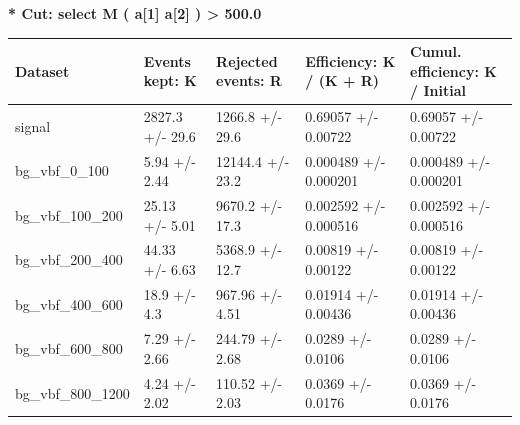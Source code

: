 \documentclass[a4paper, 10pt]{article}
\begin{document}
\textbf{* Cut: select M ( a[1] a[2] ) > 500.0}\\
   \begin{table}[H]
  \begin{center}
    \begin{tabular}{|m{20.0mm}|m{27.0mm}|m{27.0mm}|m{33.0mm}|m{32.0mm}|}
      \hline
      {\cellcolor{yellow}         Dataset}& {\cellcolor{yellow}         Events kept:
          K}& {\cellcolor{yellow}         Rejected events:
          R}& {\cellcolor{yellow}         Efficiency:
          K /\- (K + R)}& {\cellcolor{yellow}         Cumul. efficiency:
          K /\- Initial}\\
      \hline
      {\cellcolor{white}         signal}& {\cellcolor{white}         2827.3 +/\-- 29.6}& {\cellcolor{white}         1266.8 +/\-- 29.6}& {\cellcolor{white}         0.69057 +/\-- 0.00722}& {\cellcolor{white}         0.69057 +/\-- 0.00722}\\
      \hline
      {\cellcolor{white}         bg\_vbf\_0\_100}& {\cellcolor{white}         5.94 +/\-- 2.44}& {\cellcolor{white}         12144.4 +/\-- 23.2}& {\cellcolor{white}         0.000489 +/\-- 0.000201}& {\cellcolor{white}         0.000489 +/\-- 0.000201}\\
      \hline
      {\cellcolor{white}         bg\_vbf\_100\_200}& {\cellcolor{white}         25.13 +/\-- 5.01}& {\cellcolor{white}         9670.2 +/\-- 17.3}& {\cellcolor{white}         0.002592 +/\-- 0.000516}& {\cellcolor{white}         0.002592 +/\-- 0.000516}\\
      \hline
      {\cellcolor{white}         bg\_vbf\_200\_400}& {\cellcolor{white}         44.33 +/\-- 6.63}& {\cellcolor{white}         5368.9 +/\-- 12.7}& {\cellcolor{white}         0.00819 +/\-- 0.00122}& {\cellcolor{white}         0.00819 +/\-- 0.00122}\\
      \hline
      {\cellcolor{white}         bg\_vbf\_400\_600}& {\cellcolor{white}         18.9 +/\-- 4.3}& {\cellcolor{white}         967.96 +/\-- 4.51}& {\cellcolor{white}         0.01914 +/\-- 0.00436}& {\cellcolor{white}         0.01914 +/\-- 0.00436}\\
      \hline
      {\cellcolor{white}         bg\_vbf\_600\_800}& {\cellcolor{white}         7.29 +/\-- 2.66}& {\cellcolor{white}         244.79 +/\-- 2.68}& {\cellcolor{white}         0.0289 +/\-- 0.0106}& {\cellcolor{white}         0.0289 +/\-- 0.0106}\\
      \hline
      {\cellcolor{white}         bg\_vbf\_800\_1200}& {\cellcolor{white}         4.24 +/\-- 2.02}& {\cellcolor{white}         110.52 +/\-- 2.03}& {\cellcolor{white}         0.0369 +/\-- 0.0176}& {\cellcolor{white}         0.0369 +/\-- 0.0176}\\

\end{tabular}
\end{center}
\end{table}
\end{document}
